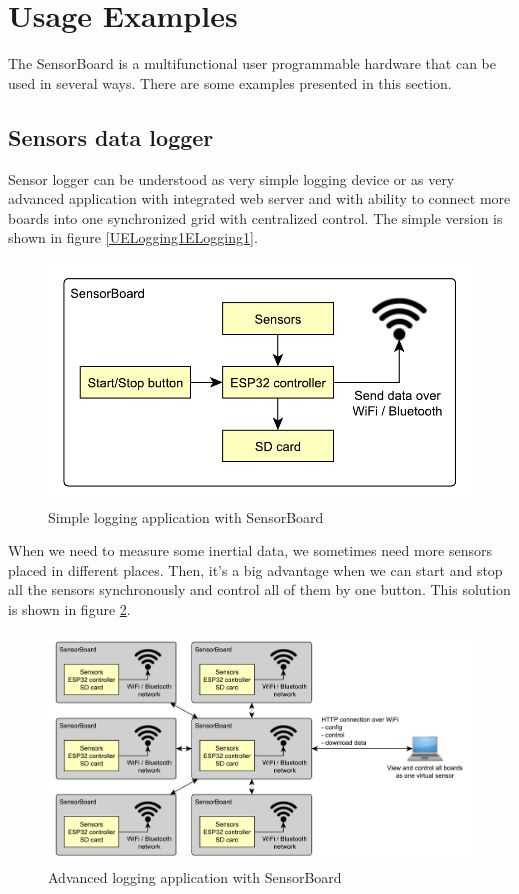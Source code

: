 \section{Usage Examples}
The SensorBoard is a multifunctional user programmable hardware that can be used in several ways. There are some examples presented in this section.

\subsection{Sensors data logger}
Sensor logger can be understood as very simple logging device or as very advanced application with integrated web server and with ability to connect more boards into one synchronized grid with centralized control. The simple version is shown in figure \ref{UELogging1ELogging1}.

\begin{figure}[H]
	\centering
	\label{UELogging1}
	\caption{Simple logging application with SensorBoard}
	\includegraphics[scale=1]{img/UsageExamplesLogger1.pdf}
\end{figure}

When we need to measure some inertial data, we sometimes need more sensors placed in different places. Then, it's a big advantage when we can start and stop all the sensors synchronously and control all of them by one button. This solution is shown in figure \ref{UELogging2}.

\begin{figure}[H]
	\centering
	\label{UELogging2}
	\caption{Advanced logging application with SensorBoard}
	\includegraphics[width=16cm]{img/UsageExamplesLogger2.pdf}
\end{figure}

